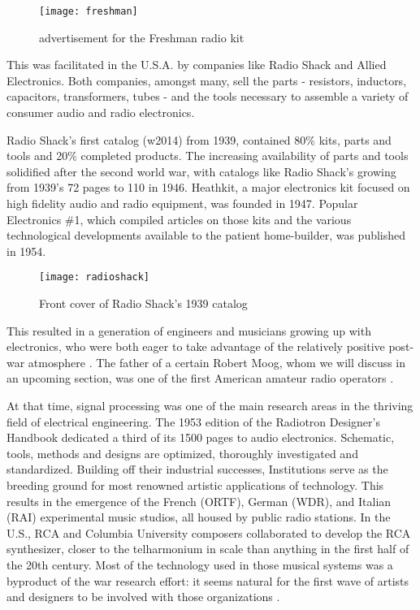 	\begin{figure}[h!]
	  \caption{advertisement for the Freshman radio kit}
	  \centering
	    \texttt{[image: freshman]}
	\end{figure}

This was facilitated in the U.S.A. by companies like Radio Shack and Allied Electronics. Both companies, amongst many, sell the parts - resistors, inductors, capacitors, transformers, tubes - and the tools necessary to assemble a variety of consumer audio and radio electronics. 

Radio Shack’s first catalog (w2014) from 1939, contained 80\% kits, parts and tools and 20\% completed products. The increasing availability of parts and tools solidified after the second world war, with catalogs like Radio Shack’s growing from 1939’s 72 pages to 110 in 1946. Heathkit, a major electronics kit focused on high fidelity audio and radio equipment, was founded in 1947. Popular Electronics \#1, which compiled articles on those kits and the various technological developments available to the patient home-builder, was published in 1954. 

	\begin{figure}[h!]
	  \caption{Front cover of Radio Shack's 1939 catalog}
	  \centering
	    \texttt{[image: radioshack]}
	\end{figure}

This resulted in a generation of engineers and musicians growing up with electronics, who were both eager to take advantage of the relatively positive post-war atmosphere \cite{holmes2002}. The father of a certain Robert Moog, whom we will discuss in an upcoming section, was one of the first American amateur radio operators \cite[p.12]{pinch2002}. 

At that time, signal processing was one of the main research areas in the thriving field of electrical engineering. The 1953 edition of the Radiotron Designer's Handbook \cite{langford1953} dedicated a third of its 1500 pages to audio electronics. Schematic, tools, methods and designs are optimized, thoroughly investigated and standardized. Building off their industrial successes, Institutions serve as the breeding ground for most renowned artistic applications of technology. This results in the emergence of the French (ORTF), German (WDR), and Italian (RAI) experimental music studios, all housed by public radio stations. In the U.S., RCA and Columbia University composers collaborated to develop the RCA synthesizer, closer to the telharmonium in scale than anything in the first half of the 20th century. Most of the technology used in those musical systems was a byproduct of the war research effort: it seems natural for the first wave of artists and designers to be involved with those organizations \cite[p.81]{holmes2002}. 

